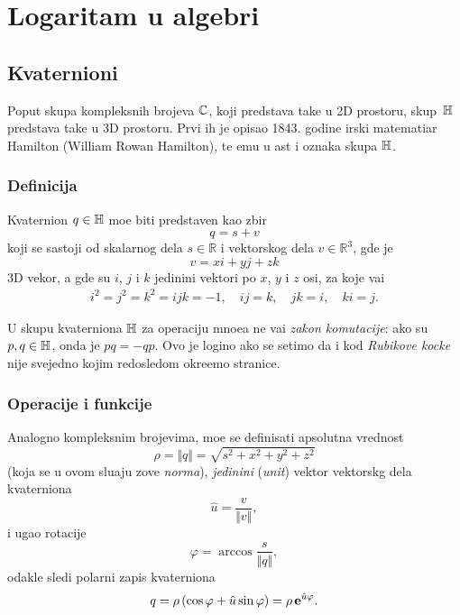 

\section{Logaritam u algebri}

\subsection{Kvaternioni}

\def\uv{{\hat u}}
\def\vp{{\vec v}}
\def\norm#1{{\Vert#1\Vert}}

Poput skupa kompleksnih brojeva ${\mathbb C}$, koji predstav{\lj}a ta{\cv}ke u 2D prostoru,
skup~${\mathbb H}$ predstav{\lj}a ta{\cv}ke u 3D prostoru. Prvi ih je opisao 
1843. godine irski ma\-te\-ma\-ti\-{\cv}ar
Hamilton (William Rowan Hamilton), te {\nj}emu u {\cv}ast i oznaka skupa ${\mathbb H}$.

\subsubsection{Definicija}

Kvaternion $q\in{\mathbb H}$ mo{\zv}e biti predstav{\lj}en kao zbir
\begin{equation}
    q=s+v
\end{equation}
koji se sastoji od skalarnog dela $s\in{\mathbb R}$ i vektorskog dela $v\in{\mathbb R}^3$, gde je
\begin{equation}
    v=xi+yj+zk
\end{equation}
3D vekor, a gde su $i$, $j$ i $k$ jedini{\cv}ni vektori po $x$, $y$ i $z$ osi,
za koje va{\zv}i
\begin{gather}    
    i^2=j^2=k^2=ijk=-1,\quad
    ij=k,\quad jk=i,\quad ki=j. 
\end{gather}

\danger U skupu kvaterniona ${\mathbb H}$ za operaciju mno{\zv}e{\nj}a ne va{\zv}i {\sl zakon komutacije}: ako su
$p,q\in{\mathbb H}$, onda je $pq=-qp$. Ovo je logi{\cv}no ako se setimo da i kod
{\sl Rubikove kocke\/} nije svejedno kojim redosledom okre{\cc}emo stranice.

\subsubsection{Operacije i funkcije}

Analogno kompleksnim brojevima, mo{\zv}e se definisati apsolutna vrednost
$$
\rho = \norm q = \sqrt{s^2+x^2+y^2+z^2}
$$
(koja se u ovom slu{\cv}aju zove {\sl norma\/}),
{\sl jedini{\cv}ni\/} ({\sl unit\/}) vektor vektorskg dela kvaterniona
$$
\uv = \frac v{\norm v},
$$
i ugao rotacije
$$
\varphi = \arccos \frac s{\norm q},
$$
odakle sledi polarni zapis kvaterniona
\begin{equation}
    q
=\rho\,(\cos\varphi + \uv\sin\varphi)
=\rho\,\e^{\uv\varphi}.
\end{equation}

